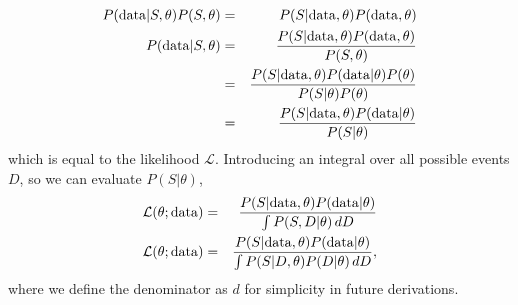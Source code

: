 \documentclass[a4paper,fleqn,usenatbib,manuscript]{emulateapj}
\begin{document}
\begin{eqnarray}
P({\rm data} | S , \theta) P(S, \theta) &=& P(S | {\rm data}, \theta) P({\rm data}, \theta)\\
P({\rm data} | S , \theta) &=& \frac{ P(S | {\rm data}, \theta) P({\rm data}, \theta) }{ P(S, \theta) }\\
&=& \frac{ P(S | {\rm data}, \theta) P({\rm data} | \theta) P(\theta)}{ P(S | \theta)  P(\theta)}\\
&=& \frac{ P(S | {\rm data}, \theta) P({\rm data} | \theta)}{ P(S | \theta) }
\end{eqnarray}
which is equal to the likelihood $\mathcal{L}$. Introducing an integral over all possible events $D$, so we can evaluate $P(S|\theta)$, 
\begin{eqnarray}
\mathcal{L}(\theta; {\rm data})&=& \frac{P(S|{\rm data},\theta) P({\rm data}|\theta)}{\int P(S, D|\theta)\, dD} \\
\mathcal{L}(\theta; {\rm data}) &=& \frac{P(S|{\rm data},\theta) P({\rm data}|\theta)}{\int P(S | D, \theta) P(D|\theta)\, dD}, \label{eq:app_main}
\end{eqnarray}
where we define the denominator as $d$ for simplicity in future derivations.
\end{document}
